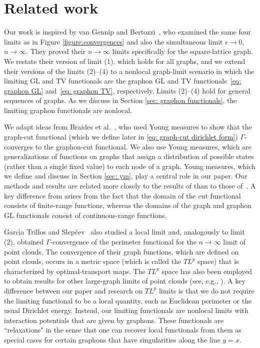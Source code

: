 \documentclass[11pt]{amsart}
\def\ep{\epsilon}
\def\ra{\rightarrow}
\numberwithin{equation}{section}
\begin{document}

\section{Related work}\label{sec: related}

Our work is inspired by van Gennip and Bertozzi~\cite{van2012gamma}, who examined the same four limits as in Figure \ref{figure:convergences} and also the simultaneous limit $\ep \ra 0$, $n \ra \infty$. They proved their $n \ra \infty$ limits specifically for
the square-lattice graph. We restate their version of limit (1), which holds for all graphs, and we extend their versions of the limits (2)--(4) to a nonlocal graph-limit scenario
in which the limiting GL and TV functionals are the graphon GL and TV functionals~\eqref{eq: graphon GL} and~\eqref{eq: graphon TV}, respectively. 
Limits (2)--(4) hold for general sequences of graphs. As we discuss in Section \ref{sec: graphon functionals}, the limiting graphon functionals are nonlocal.

We adapt ideas from Braides et al.~\cite{braides2020cut}, who used Young measures to show that the graph-cut functional (which we define later in \eqref{eq: graph-cut dirichlet form}) $\Gamma$-converges to the graphon-cut functional. We also use Young measures, which are generalizations of functions on graphs that assign 
a distribution of possible states (rather than a single fixed value) to each node of a graph. Young measures, which we define and discuss in Section \ref{sec: ym}, play a central role in our paper. Our methods and results are related more closely to the results of \cite{braides2020cut} than to those of~\cite{van2012gamma}. A key difference from \cite{braides2020cut} arises from the fact that
the domain of the cut functional {consists of} finite-range functions, whereas the domains of the graph and graphon GL functionals {consist of} continuous-range functions. 

{Garc{\'\i}a Trillos and Slep{\v{c}}ev}~\cite{trillos2013gamma} also studied a local limit and, analogously to limit (2), obtained $\Gamma$-convergence of the perimeter functional for the $n \ra \infty$ limit of point clouds. {The convergence of their graph functions, which are defined on point clouds, occurs in a metric space (which is called the $TL^p$ space) that is characterized by optimal-transport maps. The $TL^p$ space has also been employed to obtain results for other} large-graph limits of point clouds (see, e.g., \cite{trillos2015variational, garcia2016continuum, garcia2020maximum, akash2022wasserstein}). 
A key difference between our paper and research
on $TL^p$ limits is that we do not require the limiting functional to be a local quantity, such as Euclidean perimeter or the usual Dirichlet energy. Instead, our limiting functionals are nonlocal limits with interaction potentials that are given by graphons. 
These functionals are ``relaxations" in the sense that one can recover local functionals from them as special cases for certain graphons that have singularities along the line $y = x$.
\end{document}
